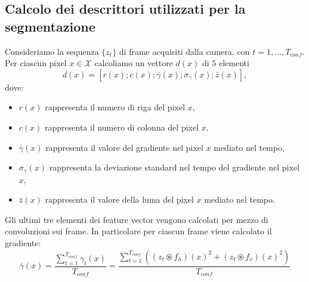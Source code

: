 \subsection{Calcolo dei descrittori utilizzati per la segmentazione}
Consideriamo la sequenza $\{z_t\}$ di frame acquisiti dalla camera, con $t=1,\dots,T_{conf}$.
Per ciascun pixel $x\in\mathcal{X}$ calcoliamo un vettore $d(x)$ di $5$ elementi
\begin{equation}
	\label{eq:featureVector}
	d(x)=\left[r(x);c(x);\bar{\gamma}(x);\sigma_{\gamma}(x);\bar{z}(x)\right],
\end{equation}
dove:
\begin{itemize}
	\item $r(x)$ rappresenta il numero di riga del pixel $x$,
	\item $c(x)$ rappresenta il numero di colonna del pixel $x$,
	\item $\bar{\gamma}(x)$ rappresenta il valore del gradiente nel pixel $x$ mediato nel tempo,
	\item $\sigma_{\gamma}(x)$ rappresenta la deviazione standard nel tempo del gradiente nel pixel $x$,
	\item $\bar{z}(x)$ rappresenta il valore della luma del pixel $x$ mediato nel tempo.
\end{itemize}
Gli ultimi tre elementi dei feature vector vengono calcolati per mezzo di convoluzioni sui frame.
In particolare per ciascun frame viene calcolato il gradiente:
\[\bar{\gamma}(x)=\frac{\sum_{t=1}^{T_{conf}}\gamma_t(x)}{T_{conf}}=\frac{\sum_{t=1}^{T_{conf}}\left(\left(z_t \circledast f_h\right)(x)^2 + \left(z_t \circledast f_v\right)(x)^2\right)}{T_{conf}}\]


